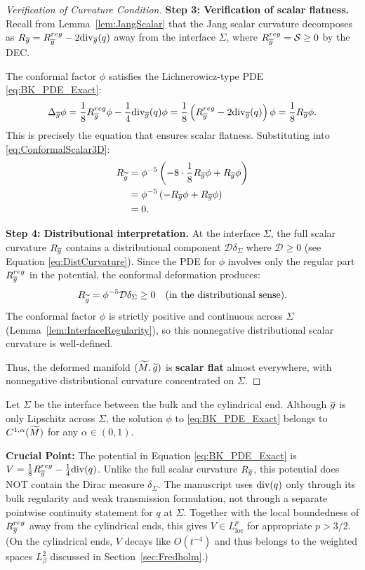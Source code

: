 \begin{proof}[Verification of Curvature Condition]
\textbf{Step 3: Verification of scalar flatness.}
Recall from Lemma~\ref{lem:JangScalar} that the Jang scalar curvature decomposes as $R_{\overline{g}} = R_{\overline{g}}^{reg} - 2\mathrm{div}_{\overline{g}}(q)$ away from the interface $\Sigma$, where $R_{\overline{g}}^{reg} = \mathcal{S} \ge 0$ by the DEC.

The conformal factor $\phi$ satisfies the Lichnerowicz-type PDE \eqref{eq:BK_PDE_Exact}:
\[
    \Delta_{\overline{g}}\phi = \frac{1}{8}R_{\overline{g}}^{reg}\phi - \frac{1}{4}\mathrm{div}_{\overline{g}}(q)\phi = \frac{1}{8}\left( R_{\overline{g}}^{reg} - 2\mathrm{div}_{\overline{g}}(q) \right)\phi = \frac{1}{8}R_{\overline{g}} \phi.
\]
This is precisely the equation that ensures scalar flatness. Substituting into \eqref{eq:ConformalScalar3D}:
\begin{align*}
    R_{\widetilde{g}} &= \phi^{-5} \left( -8 \cdot \frac{1}{8}R_{\overline{g}}\phi + R_{\overline{g}} \phi \right) \\
         &= \phi^{-5} \left( -R_{\overline{g}}\phi + R_{\overline{g}} \phi \right) \\
         &= 0.
\end{align*}

\textbf{Step 4: Distributional interpretation.}
At the interface $\Sigma$, the full scalar curvature $R_{\overline{g}}$ contains a distributional component $\mathcal{D}\delta_\Sigma$ where $\mathcal{D} \ge 0$ (see Equation \eqref{eq:DistCurvature}). Since the PDE for $\phi$ involves only the regular part $R_{\overline{g}}^{reg}$ in the potential, the conformal deformation produces:
\[
    R_{\widetilde{g}} = \phi^{-5}\mathcal{D}\delta_\Sigma \ge 0 \quad \text{(in the distributional sense)}.
\]
The conformal factor $\phi$ is strictly positive and continuous across $\Sigma$ (Lemma~\ref{lem:InterfaceRegularity}), so this nonnegative distributional scalar curvature is well-defined.

Thus, the deformed manifold $(\widetilde{M}, \widetilde{g})$ is \textbf{scalar flat} almost everywhere, with nonnegative distributional curvature concentrated on $\Sigma$.
\end{proof}

\begin{lemma}\label{lem:InterfaceRegularity}
Let $\Sigma$ be the interface between the bulk and the cylindrical end. Although $\overline{g}$ is only Lipschitz across $\Sigma$, the solution $\phi$ to \eqref{eq:BK_PDE_Exact} belongs to $C^{1,\alpha}(\widetilde{M})$ for any $\alpha \in (0,1)$.

\textbf{Crucial Point:} The potential in Equation \eqref{eq:BK_PDE_Exact} is $V = \frac{1}{8}R_{\overline{g}}^{reg} - \frac{1}{4}\mathrm{div}(q)$. Unlike the full scalar curvature $R_{\overline{g}}$, this potential does NOT contain the Dirac measure $\delta_\Sigma$. The manuscript uses $\mathrm{div}(q)$ only through its bulk regularity and weak transmission formulation, not through a separate pointwise continuity statement for $q$ at $\Sigma$. Together with the local boundedness of $R_{\overline{g}}^{reg}$ away from the cylindrical ends, this gives $V \in L^p_{\text{loc}}$ for appropriate $p > 3/2$. (On the cylindrical ends, $V$ decays like $O(t^{-4})$ and thus belongs to the weighted spaces $L^2_\beta$ discussed in Section~\ref{sec:Fredholm}.)
\end{lemma}

